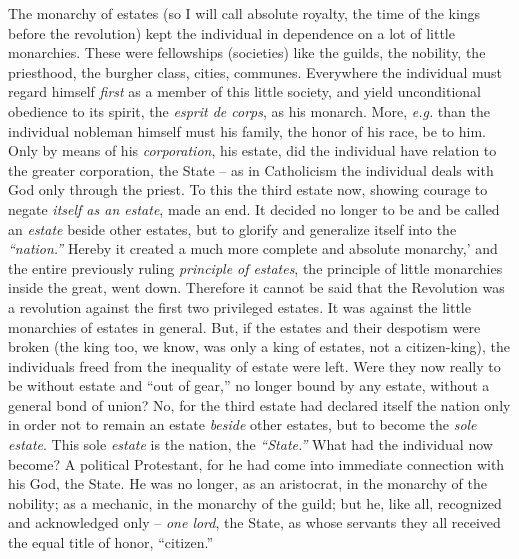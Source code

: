 The monarchy of estates (so I will call absolute royalty, the time of the 
kings before the revolution) kept the individual in dependence on a lot of 
little monarchies. These were fellowships (societies) like the guilds, the 
nobility, the priesthood, the burgher class, cities, communes. Everywhere the 
individual must regard himself \textit{first} as a member of this little 
society, and yield unconditional obedience to its spirit, the \textit{esprit 
de corps}, as his monarch. More, \textit{e.g.} than the individual nobleman 
himself must his family, the honor of his race, be to him. Only by means of 
his \textit{corporation}, his estate, did the individual have relation to the 
greater corporation, the State -- as in Catholicism the individual deals with 
God only through the priest. To this the third estate now, showing courage to 
negate \textit{itself as an estate}, made an end. It decided no longer to be 
and be called an \textit{estate} beside other estates, but to glorify and 
generalize itself into the \textit{``nation.''} Hereby it created a much 
more complete and absolute monarchy,' and the entire previously ruling 
\textit{principle of estates}, the principle of little monarchies inside the 
great, went down. Therefore it cannot be said that the Revolution was a 
revolution against the first two privileged estates. It was against the little 
monarchies of estates in general. But, if the estates and their despotism were 
broken (the king too, we know, was only a king of estates, not a 
citizen-king), the individuals freed from the inequality of estate were left. 
Were they now really to be without estate and ``out of gear,'' no longer 
bound by any estate, without a general bond of union? No, for the third estate 
had declared itself the nation only in order not to remain an estate 
\textit{beside} other estates, but to become the \textit{sole estate}. This 
sole \textit{estate} is the nation, the \textit{``State.''} What had the 
individual now become? A political Protestant, for he had come into immediate 
connection with his God, the State. He was no longer, as an aristocrat, in the 
monarchy of the nobility; as a mechanic, in the monarchy of the guild; but he, 
like all, recognized and acknowledged only -- \textit{one lord}, the State, as 
whose servants they all received the equal title of honor, ``citizen.''

